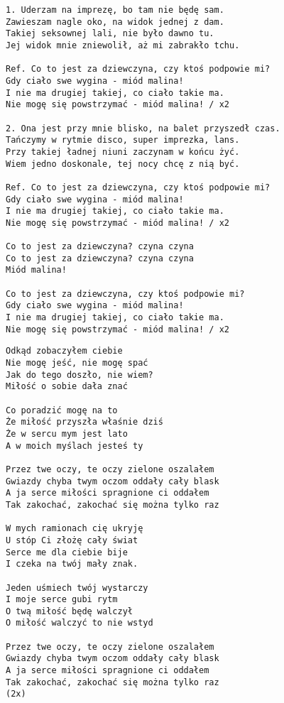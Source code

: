 \documentclass[12pt]{article}
\begin{document}
\begin{verbatim}
1. Uderzam na imprezę, bo tam nie będę sam.
Zawieszam nagle oko, na widok jednej z dam.
Takiej seksownej lali, nie było dawno tu.
Jej widok mnie zniewolił, aż mi zabrakło tchu.

Ref. Co to jest za dziewczyna, czy ktoś podpowie mi?
Gdy ciało swe wygina - miód malina!
I nie ma drugiej takiej, co ciało takie ma.
Nie mogę się powstrzymać - miód malina! / x2

2. Ona jest przy mnie blisko, na balet przyszedł czas.
Tańczymy w rytmie disco, super imprezka, lans.
Przy takiej ładnej niuni zaczynam w końcu żyć.
Wiem jedno doskonale, tej nocy chcę z nią być.

Ref. Co to jest za dziewczyna, czy ktoś podpowie mi?
Gdy ciało swe wygina - miód malina!
I nie ma drugiej takiej, co ciało takie ma.
Nie mogę się powstrzymać - miód malina! / x2

Co to jest za dziewczyna? czyna czyna
Co to jest za dziewczyna? czyna czyna
Miód malina!

Co to jest za dziewczyna, czy ktoś podpowie mi?
Gdy ciało swe wygina - miód malina!
I nie ma drugiej takiej, co ciało takie ma.
Nie mogę się powstrzymać - miód malina! / x2
\end{verbatim}
\clearpage

\begin{verbatim}
Odkąd zobaczyłem ciebie
Nie mogę jeść, nie mogę spać
Jak do tego doszło, nie wiem?
Miłość o sobie dała znać

Co poradzić mogę na to
Że miłość przyszła właśnie dziś
Że w sercu mym jest lato
A w moich myślach jesteś ty

Przez twe oczy, te oczy zielone oszalałem
Gwiazdy chyba twym oczom oddały cały blask
A ja serce miłości spragnione ci oddałem
Tak zakochać, zakochać się można tylko raz

W mych ramionach cię ukryję
U stóp Ci złożę cały świat
Serce me dla ciebie bije
I czeka na twój mały znak.

Jeden uśmiech twój wystarczy
I moje serce gubi rytm
O twą miłość będę walczył
O miłość walczyć to nie wstyd

Przez twe oczy, te oczy zielone oszalałem
Gwiazdy chyba twym oczom oddały cały blask
A ja serce miłości spragnione ci oddałem
Tak zakochać, zakochać się można tylko raz
(2x)
\end{verbatim}
\clearpage
\end{document}
